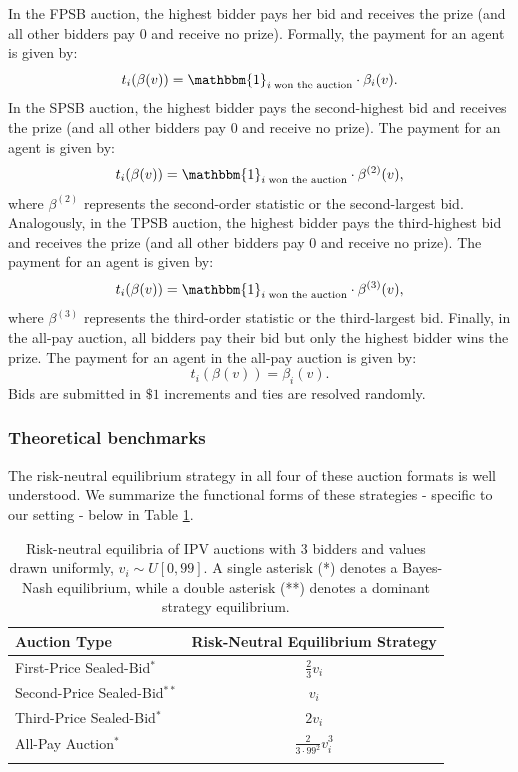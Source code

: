 \documentclass{article} %
\begin{document}
In the FPSB auction, the highest bidder pays her bid and receives the prize (and all other bidders pay $0$ and receive no prize). Formally, the payment for an agent is given by: $$t_i(\beta(v)) = \mathbbm{1}_{i \; \text{won the auction}}\cdot \beta_i(v).$$
In the SPSB auction, the highest bidder pays the second-highest bid and receives the prize (and all other bidders pay $0$ and receive no prize). 
The payment for an agent is given by: $$t_i(\beta(v)) = \mathbbm{1}_{i \; \text{won the auction}} \cdot \beta^{(2)}(v),$$ where $\beta^{(2)}$ represents the second-order statistic or the second-largest bid. 
Analogously, in the TPSB auction, the highest bidder pays the third-highest bid and receives the prize (and all other bidders pay $0$ and receive no prize). The payment for an agent is given by: $$t_i(\beta(v)) = \mathbbm{1}_{i \; \text{won the auction}} \cdot \beta^{(3)}(v),$$ where $\beta^{(3)}$ represents the third-order statistic or the third-largest bid.
Finally, in the all-pay auction, all bidders pay their bid but only the highest bidder wins the prize. The payment for an agent in the all-pay auction is given by: $$t_i(\beta(v)) = \beta_i(v).$$
Bids are submitted in $\$1$ increments and ties are resolved randomly. 

\subsubsection{Theoretical benchmarks}\label{sec:ipv-theory}
The risk-neutral equilibrium strategy in all four of these auction formats is well understood. We summarize the functional forms of these strategies - specific to our setting - below in Table \ref{tab:risk-neutral-eqm}. 
\begin{table}[h]
    \centering
    \renewcommand{\arraystretch}{1.4} %
    \begin{tabular}{l c}
        \hline
        \textbf{Auction Type} & \textbf{Risk-Neutral Equilibrium Strategy} \\ 
        \hline
        First-Price Sealed-Bid$^*$ & $\frac{2}{3}v_i$ \\ 
        Second-Price Sealed-Bid$^{**}$ & $v_i$ \\ 
        Third-Price Sealed-Bid$^*$ & $2v_i$ \\ 
        All-Pay Auction$^*$ & $\frac{2}{3 \cdot 99^2} v_i^3$ \\ 
        \vspace{-5mm} \\ %
        \hline
    \end{tabular}
    \caption{Risk-neutral equilibria of IPV auctions with 3 bidders and values drawn uniformly, $v_i \sim U[0, 99].$ A single asterisk (*) denotes a Bayes-Nash equilibrium, while a double asterisk (**) denotes a dominant strategy equilibrium.}
    \label{tab:risk-neutral-eqm}
\end{table}
\end{document}
